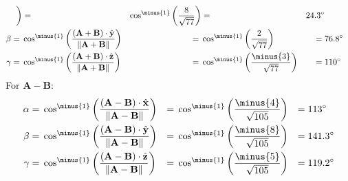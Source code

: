 \begin{solution}
\begin{subequations}
\begin{align}
                        \bigg)
                        &=\;&\cos^{\minus{1}}
                            \bigg(\frac{8}{\sqrt{77}}\bigg)
                        &=\;&24.3^{\circ}\\
                        \beta=\;&\cos^{\minus{1}}\bigg(
                            \frac{(\mathbf{A}+\mathbf{B})
                            \cdot\hat{\mathbf{y}}}
                            {\norm{\mathbf{A}+\mathbf{B}}}
                        \bigg)
                        &=\;&\cos^{\minus{1}}
                            \bigg(\frac{2}{\sqrt{77}}\bigg)
                        &=\;&76.8^{\circ}\\
                        \gamma=\;&\cos^{\minus{1}}\bigg(
                            \frac{(\mathbf{A}+\mathbf{B})
                            \cdot\hat{\mathbf{z}}}
                            {\norm{\mathbf{A+B}}}
                        \bigg)
                        &=\;&\cos^{\minus{1}}
                            \bigg(\frac{\minus{3}}{\sqrt{77}}\bigg)
                        &=\;&110^{\circ}
                    \end{align}
                \end{subequations}
                For $\mathbf{A}-\mathbf{B}$:
                \begin{subequations}
                    \begin{align}
                        \alpha=\;&\cos^{\minus{1}}\bigg(
                            \frac{(\mathbf{A}-\mathbf{B})
                            \cdot\hat{\mathbf{x}}}
                            {\norm{\mathbf{A-B}}}
                        \bigg)
                        &=\;&\cos^{\minus{1}}
                            \bigg(\frac{\minus{4}}{\sqrt{105}}\bigg)
                        &=\;&113^{\circ}\\
                        \beta=\;&\cos^{\minus{1}}\bigg(
                            \frac{(\mathbf{A}-\mathbf{B})
                            \cdot\hat{\mathbf{y}}}
                            {\norm{\mathbf{A}-\mathbf{B}}}
                        \bigg)
                        &=\;&\cos^{\minus{1}}
                            \bigg(\frac{\minus{8}}{\sqrt{105}}\bigg)
                        &=\;&141.3^{\circ}\\
                        \gamma=\;&\cos^{\minus{1}}\bigg(
                            \frac{(\mathbf{A}-\mathbf{B})
                            \cdot\hat{\mathbf{z}}}
                            {\norm{\mathbf{A-B}}}
                        \bigg)
                        &=\;&\cos^{\minus{1}}
                            \bigg(\frac{\minus{5}}{\sqrt{105}}\bigg)
                        &=\;&119.2^{\circ}
                    \end{align}
                \end{subequations}
            \end{solution}
